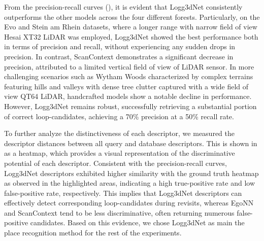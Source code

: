 From the precision-recall curves (), it is evident that Logg3dNet consistently outperforms the other models across the four different forests. Particularly, on the Evo and Stein am Rhein datasets, where a longer range with narrow field of view Hesai XT32 LiDAR was employed, Logg3dNet showed the best performance both in terms of precision and recall, without experiencing any sudden drops in precision.
In contrast, ScanContext demonstrates a significant decrease in precision, attributed to a limited vertical field of view of LiDAR sensor. In more challenging scenarios such as Wytham Woods characterized by complex terrains featuring hills and valleys with dense tree clutter captured with a wide field of view QT64 LiDAR, handcrafted models show a notable decline in performance. However, Logg3dNet remains robust, successfully retrieving a substantial portion of correct loop-candidates, achieving a 70\% precision at a 50\% recall rate. 


To further analyze the distinctiveness of each descriptor, we measured the descriptor distances between all query and database descriptors. This is shown in  as a heatmap, which provides a visual representation of the discriminative potential of each descriptor. Consistent with the precision-recall curves, Logg3dNet descriptors exhibited higher similarity with the ground truth heatmap as observed in the highlighted areas, indicating a high true-positive rate and low false-positive rate, respectively. This implies that Logg3dNet descriptors can effectively detect corresponding loop-candidates during revisits, whereas EgoNN and ScanContext tend to be less discriminative, often returning numerous false-positive candidates. Based on this evidence, we chose Logg3dNet as main the place recognition method for the rest of the experiments.


